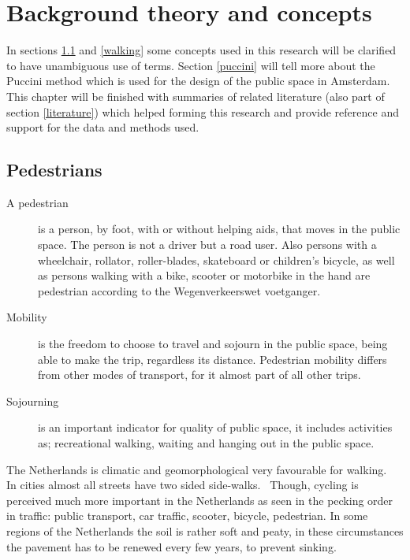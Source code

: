 \chapter[Background theory and concepts]{Background theory and concepts}
In sections \ref{pedestrians} and \ref{walking} some concepts used in this research will be clarified to have unambiguous use of terms. Section \ref{puccini} will tell more about the Puccini method which is used for the design of the public space in Amsterdam. 
This chapter will be finished with summaries of related literature (also part of section \ref{literature}) which helped forming this research and provide reference and support for the data and methods used.

\section[Pedestrians]{Pedestrians}\label{pedestrians}
\begin{description}\item[A pedestrian] is a person, by foot, with or without helping aids, that moves in the public space. The person is not a driver but a road user. Also persons with a wheelchair, rollator, roller-blades, skateboard or children's bicycle, as well as persons walking with a bike, scooter or motorbike in the hand are pedestrian according to the Wegenverkeerswet voetganger.~\cite{Crow2014}
\item[Mobility] is the freedom to choose to travel and sojourn in the public space, being able to make the trip, regardless its distance. Pedestrian mobility differs from other modes of transport, for it almost part of all other trips.~\cite{Sauter2010}
\item[Sojourning] is an important indicator for quality of public space, it includes activities as; recreational walking, waiting and hanging out in the public space.~\cite{Sauter2010} \end{description}

The Netherlands is climatic and geomorphological very favourable for walking.~\cite{Sauter2010} In cities almost all streets have two sided side-walks.~\cite{Sauter2010} Though, cycling is perceived much more important in the Netherlands as seen in the pecking order in traffic: public transport, car traffic, scooter, bicycle, pedestrian. In some regions of the Netherlands the soil is rather soft and peaty, in these circumstances the pavement has to be renewed every few years, to prevent sinking.

